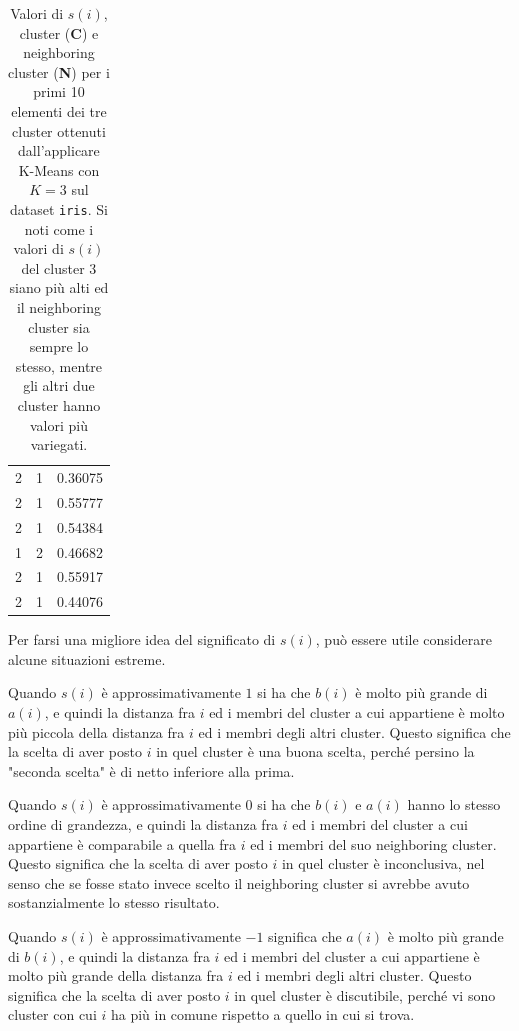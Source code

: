 \documentclass[a4paper, 12pt]{report}
\begin{document}
\begin{table}
\begin{minipage}{0.3\textwidth}
\begin{tabular}{c c c}
						2 & 1 & 0.36075 \\
						2 & 1 & 0.55777 \\
						2 & 1 & 0.54384 \\
						1 & 2 & 0.46682 \\
						2 & 1 & 0.55917 \\
						2 & 1 & 0.44076 \\
						\hline
					\end{tabular}
				\end{minipage}
				\caption{Valori di $s(i)$, cluster (\textbf{C}) e neighboring
				cluster (\textbf{N}) per i primi 10 elementi dei tre cluster
				ottenuti dall'applicare K-Means con $K = 3$ sul dataset
				\texttt{iris}. Si noti come i valori di $s(i)$ del cluster
				$3$ siano più alti ed il neighboring cluster sia sempre lo
				stesso, mentre gli altri due cluster hanno valori più
				variegati.}
				\label{tab:iris}
			\end{table}

			Per farsi una migliore idea del significato di $s(i)$, può essere
			utile considerare alcune situazioni estreme.

			Quando $s(i)$ è approssimativamente $1$ si ha che $b(i)$ è molto
			più grande di $a(i)$, e quindi la distanza fra $i$ ed i membri del
			cluster a cui appartiene è molto più piccola della distanza fra $i$
			ed i membri degli altri cluster. Questo significa che la scelta di
			aver posto $i$ in quel cluster è una buona scelta, perché persino
			la "seconda scelta" è di netto inferiore alla prima.

			Quando $s(i)$ è approssimativamente $0$ si ha che $b(i)$ e $a(i)$
			hanno lo stesso ordine di grandezza, e quindi la distanza fra $i$
			ed i membri del cluster a cui appartiene è comparabile a quella
			fra $i$ ed i membri del suo neighboring cluster. Questo significa
			che la scelta di aver posto $i$ in quel cluster è inconclusiva,
			nel senso che se fosse stato invece scelto il neighboring cluster
			si avrebbe avuto sostanzialmente lo stesso risultato.

			Quando $s(i)$ è approssimativamente $-1$ significa che $a(i)$ è molto
			più grande di $b(i)$, e quindi la distanza fra $i$ ed i membri del
			cluster a cui appartiene è molto più grande della distanza fra $i$
			ed i membri degli altri cluster. Questo significa che la scelta di
			aver posto $i$ in quel cluster è discutibile, perché vi sono cluster
			con cui $i$ ha più in comune rispetto a quello in cui si trova.
\end{document}
